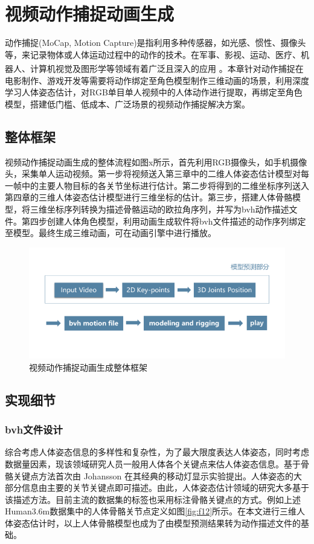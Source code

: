
\chapter{视频动作捕捉动画生成}
动作捕捉(MoCap, Motion Capture)是指利用多种传感器，如光感、惯性、摄像头等，来记录物体或人体运动过程中的动作的技术。在军事、影视、运动、医疗、机器人、计算机视觉及图形学等领域有着广泛且深入的应用\textsuperscript{\cite{p14}} 。本章针对动作捕捉在电影制作、游戏开发等需要将动作绑定至角色模型制作三维动画的场景，利用深度学习人体姿态估计，对RGB单目单人视频中的人体动作进行提取，再绑定至角色模型，搭建低门槛、低成本、广泛场景的视频动作捕捉解决方案。

\section{整体框架}

视频动作捕捉动画生成的整体流程如图x所示，首先利用RGB摄像头，如手机摄像头，采集单人运动视频。第一步将视频送入第三章中的二维人体姿态估计模型对每一帧中的主要人物目标的各关节坐标进行估计。第二步将得到的二维坐标序列送入第四章的三维人体姿态估计模型进行三维坐标的估计。第三步，搭建人体骨骼模型，将三维坐标序列转换为描述骨骼运动的欧拉角序列，并写为bvh动作描述文件。第四步创建人体角色模型，利用动画生成软件将bvh文件描述的动作序列绑定至模型。最终生成三维动画，可在动画引擎中进行播放。
\begin{figure}[h]
	\centering
	\includegraphics[scale=1]{figures/27.png}
	\caption{视频动作捕捉动画生成整体框架}
	\label{fig:f27}
\end{figure}

\section{实现细节}
\subsection{bvh文件设计}{}
综合考虑人体姿态信息的多样性和复杂性，为了最大限度表达人体姿态，同时考虑数据量因素，现该领域研究人员一般用人体各个关键点来估人体姿态信息。基于骨骼关键点方法首次由  Johansson 在其经典的移动灯显示实验提出。人体姿态的大部分信息由主要的关节关键点即可描述。由此，人体姿态估计领域的研究大多基于该描述方法。目前主流的数据集的标签也采用标注骨骼关键点的方式。例如上述Human3.6m数据集中的人体骨骼关节点定义如图\ref{fig:f12}所示。在本文进行三维人体姿态估计时，以上人体骨骼模型也成为了由模型预测结果转为动作描述文件的基础。

